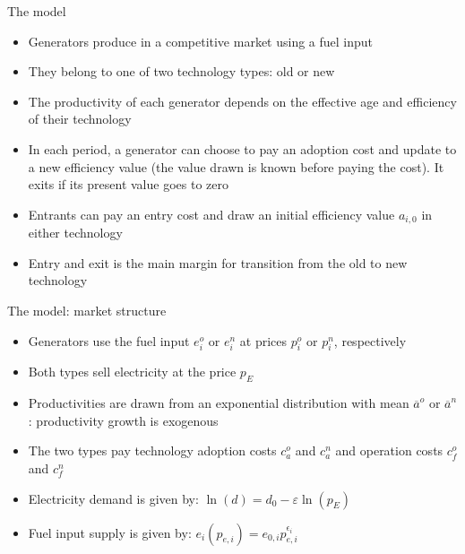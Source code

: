 \documentclass{beamer}
\begin{document}
\begin{frame}{The model}\label{model_struct}

\begin{itemize}
 \item Generators produce in a competitive market using a fuel input
 \item They belong to one of two technology types: old or new
 \item The productivity of each generator depends on the effective age and efficiency of their technology
 \item In each period, a generator can choose to pay an adoption cost and update to a new efficiency value (the value drawn is known before paying the cost). It exits if its present value goes to zero
 \item Entrants can pay an entry cost and draw an initial efficiency value $a_{i,0}$ in either technology
 \item Entry and exit is the main margin for transition from the old to new technology
\end{itemize}

    \hyperlink{definitions}{}  
\end{frame}
\begin{frame}{The model: market structure}
\begin{itemize}
 \item Generators use the fuel input $e_i^o$ or $e_i^n$ at prices $p_i^o$ or $p_i^n$, respectively
  \item Both types sell electricity at the price $p_E$
 \item Productivities are drawn from an exponential distribution with mean $\overline{a}^o$ or $\overline{a}^n$: productivity growth is exogenous
 \item The two types pay technology adoption costs $c_a^o$ and $c_a^n$ and operation costs $c_f^o$ and $c_f^n$
 \hfill \break
 \item Electricity demand is given by: $\ln(d) = d_0-\varepsilon\ln(p_E)$
 \item Fuel input supply is given by:  $e_i(p_{e,i}) = e_{0,i}p_{e,i}^{\epsilon_{i}}$

\end{itemize}
    
\end{frame}
\end{document}
